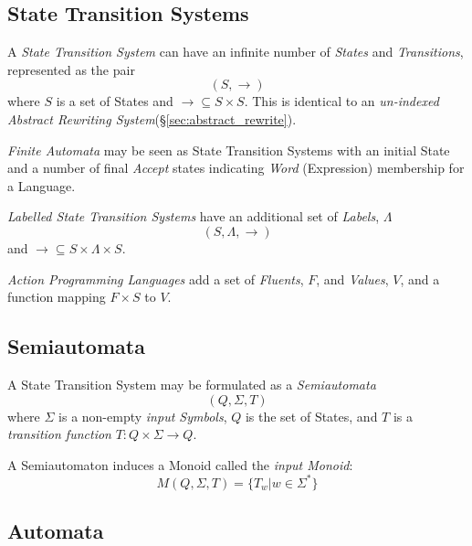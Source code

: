 \subsection{State Transition Systems} \label{sec:state_transition_system}

A \emph{State Transition System} can have an infinite number of
\emph{States} and \emph{Transitions}, represented as the pair
\[
    (S,\rightarrow)
\]
where $S$ is a set of States and $\rightarrow \subseteq S \times S$.
This is identical to an \emph{un-indexed Abstract Rewriting
  System}(\S\ref{sec:abstract_rewrite}).

\emph{Finite Automata} may be seen as State Transition Systems with an
initial State and a number of final \emph{Accept} states indicating
\emph{Word} (Expression) membership for a Language.

\emph{Labelled State Transition Systems} have an additional set of
\emph{Labels}, $\Lambda$
\[(S,\Lambda,\rightarrow)\]
and $\rightarrow \subseteq S \times \Lambda \times S$.

\emph{Action Programming Languages} add a set of \emph{Fluents}, $F$, and
\emph{Values}, $V$, and a function mapping $F \times S$ to $V$.



\subsection{Semiautomata}\label{sec:semiautomata}

A State Transition System may be formulated as a \emph{Semiautomata}
\[
    (Q,\Sigma,T)
\]
where $\Sigma$ is a non-empty \emph{input Symbols}, $Q$ is the set of
States, and $T$ is a \emph{transition function} $T:Q \times \Sigma
\rightarrow Q$.

A Semiautomaton induces a Monoid called the \emph{input Monoid}:
\[
    M(Q,\Sigma,T) = \{T_w | w \in \Sigma^*\}
\]



\subsection{Automata} \label{sec:automata}

